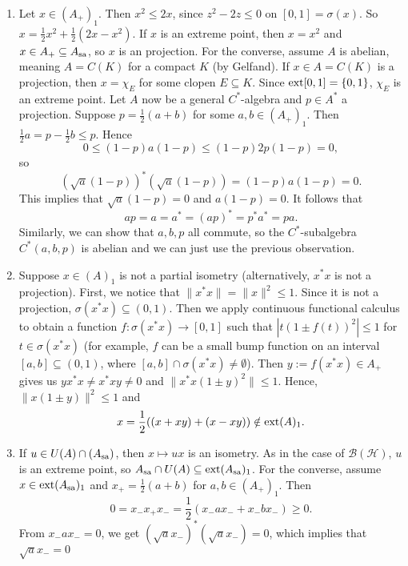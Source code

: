 \begin{myproof}
  \begin{enumerate}
    \item Let $x \in (A_+)_1$. Then $x^2 \leq 2x$, since $z^2 - 2z \leq 0$ on $[0, 1] = \sigma(x)$.
    So $x = \frac{1}{2} x^2 + \frac{1}{2} (2x - x^2)$.
    If $x$ is an extreme point, then $x = x^2$ and $x \in A_+ \subseteq A_{\operatorname{sa}}$, so $x$ is an projection.
    For the converse, assume $A$ is abelian, meaning $A = C(K)$
    for a compact $K$ (by Gelfand). If $x \in A = C(K)$ is a projection, then $x = \chi_{E}$
    for some clopen $E \subseteq K$. Since $\operatorname{ext} [0, 1] = \{0, 1\}$, $\chi_E$ is an extreme point.
    Let $A$ now be a general $C^*$-algebra and $p \in A^*$ a projection. Suppose $p = \frac{1}{2} (a + b)$
    for some $a, b \in (A_+)_1$. Then $\frac{1}{2} a = p - \frac{1}{2} b \leq p$.
    Hence 
    $$0 \leq (1 - p)a(1 - p) \leq (1 - p) 2p (1 - p) = 0,$$
    so $$(\sqrt{a} (1 - p))^* (\sqrt{a} (1 - p)) = (1 - p)a(1 - p) = 0.$$
    This implies that $\sqrt{a} (1 - p) = 0$ and $a (1 - p) = 0$.
    It follows that
    $$ap = a = a^* = (ap)^* = p^* a^* = pa.$$
    Similarly, we can show that $a, b, p$ all commute, so the $C^*$-subalgebra $C^*(a, b, p)$ is abelian and we can just use the previous observation.
    \item Suppose $x \in (A)_1$ is not a partial isometry (alternatively, $x^* x$ is not a projection).
    First, we notice that $\| x^* x\| = \|x\|^2 \leq 1$. Since it is not a projection, $\sigma(x^* x) \subseteq (0, 1)$.
    Then we apply continuous functional calculus to obtain a function $f: \sigma(x^* x) \to [0, 1]$ such that 
    $|t (1 \pm f(t))^2| \leq 1$ for $t \in \sigma(x^* x)$ (for example, $f$ can be a small bump function on an interval $[a, b] \subseteq (0, 1)$, where $[a, b] \cap \sigma(x^* x) \neq \emptyset$).
    Then $y := f(x^* x) \in A_+$ gives us $yx^* x \neq x^* x y \neq 0$
    and $\|x^* x (1 \pm y)^2\| \leq 1$. Hence, $\|x (1 \pm y)\|^2 \leq 1$ and 
    $$x = \frac{1}{2} ((x + xy) + (x - xy)) \notin \operatorname{ext}(A)_1.$$
    \item If $u \in U(A) \cap (A_{\operatorname{sa}})$, then $x \mapsto ux$ is an isometry. As in the case of $\mathcal{B}(\mathcal{H})$,
    $u$ is an extreme point, so $A_{\operatorname{sa}} \cap U(A) \subseteq \operatorname{ext} (A_{\operatorname{sa}})_1$. For the converse, assume 
    $x \in \operatorname{ext} (A_{\operatorname{sa}})_1$ and $x_+ = \frac{1}{2} (a + b)$ for $a, b \in (A_+)_{1}$. Then 
    $$0 = x_- x_+ x_- = \frac{1}{2} (x_- a x_- + x_- b x_-) \geq 0.$$
    From $x_- a x_- = 0$, we get $(\sqrt{a} x_-)^* (\sqrt{a} x_-) = 0$, which implies that $\sqrt{a} x_- = 0$

\end{enumerate}
\end{myproof}
